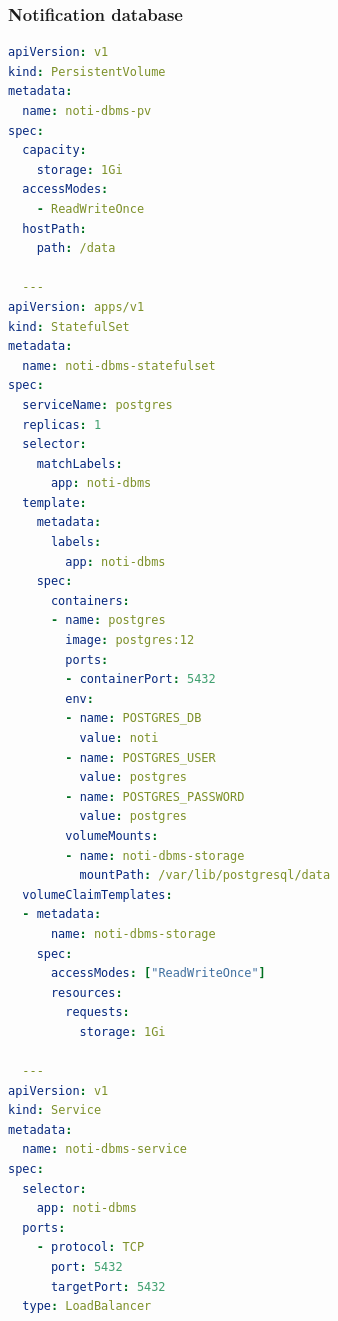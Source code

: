 \subsubsection*{Notification database}
\begin{lstlisting}[language=yaml]
apiVersion: v1
kind: PersistentVolume
metadata:
  name: noti-dbms-pv
spec:
  capacity:
    storage: 1Gi
  accessModes:
    - ReadWriteOnce
  hostPath:
    path: /data

  ---
apiVersion: apps/v1
kind: StatefulSet
metadata:
  name: noti-dbms-statefulset
spec:
  serviceName: postgres
  replicas: 1
  selector:
    matchLabels:
      app: noti-dbms
  template:
    metadata:
      labels:
        app: noti-dbms
    spec:
      containers:
      - name: postgres
        image: postgres:12
        ports:
        - containerPort: 5432
        env:
        - name: POSTGRES_DB
          value: noti
        - name: POSTGRES_USER
          value: postgres
        - name: POSTGRES_PASSWORD
          value: postgres
        volumeMounts:
        - name: noti-dbms-storage
          mountPath: /var/lib/postgresql/data
  volumeClaimTemplates:
  - metadata:
      name: noti-dbms-storage
    spec:
      accessModes: ["ReadWriteOnce"]
      resources:
        requests:
          storage: 1Gi

  ---
apiVersion: v1
kind: Service
metadata:
  name: noti-dbms-service
spec:
  selector:
    app: noti-dbms
  ports:
    - protocol: TCP
      port: 5432
      targetPort: 5432
  type: LoadBalancer
\end{lstlisting}

